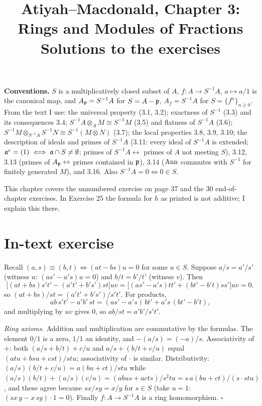 \documentclass[11pt]{article}
\title{Atiyah--Macdonald, Chapter 3: Rings and Modules of Fractions\\[2pt]\large Solutions to the exercises}
\author{}
\date{}
\begin{document}
\maketitle
\noindent\textbf{Conventions.} $S$ is a multiplicatively closed subset of $A$, $f:A\to S^{-1}A$, $a\mapsto a/1$ is the canonical map, and $A_\mathfrak p=S^{-1}A$ for $S=A-\mathfrak p$, $A_f=S^{-1}A$ for $S=\{f^n\}_{n\ge0}$. From the text I use: the universal property (3.1, 3.2); exactness of $S^{-1}$ (3.3) and its consequences 3.4; $S^{-1}A\otimes_AM\cong S^{-1}M$ (3.5) and flatness of $S^{-1}A$ (3.6); $S^{-1}M\otimes_{S^{-1}A}S^{-1}N\cong S^{-1}(M\otimes N)$ (3.7); the local properties 3.8, 3.9, 3.10; the description of ideals and primes of $S^{-1}A$ (3.11: every ideal of $S^{-1}A$ is extended; $\mathfrak a^e=(1)\iff\mathfrak a\cap S\ne\emptyset$; primes of $S^{-1}A\leftrightarrow$ primes of $A$ not meeting $S$), 3.12, 3.13 (primes of $A_\mathfrak p\leftrightarrow$ primes contained in $\mathfrak p$), 3.14 ($\operatorname{Ann}$ commutes with $S^{-1}$ for finitely generated $M$), and 3.16. Also $S^{-1}A=0\iff0\in S$.

This chapter covers the unnumbered exercise on page 37 and the 30 end-of-chapter exercises. In Exercise 25 the formula for $h$ as printed is not additive; I explain this there.

\section*{In-text exercise}

\pf
Recall $(a,s)\equiv(b,t)\iff(at-bs)u=0$ for some $u\in S$. Suppose $a/s=a'/s'$ (witness $u$: $(as'-a's)u=0$) and $b/t=b'/t'$ (witness $v$). Then
\[
\bigl[(at+bs)s't'-(a't'+b's')st\bigr]uv=\bigl[(as'-a's)tt'+(bt'-b't)ss'\bigr]uv=0,
\]
so $(at+bs)/st=(a't'+b's')/s't'$. For products,
\[
ab\,s't'-a'b'\,st=(as'-a's)\,bt'+a's\,(bt'-b't),
\]
and multiplying by $uv$ gives $0$, so $ab/st=a'b'/s't'$.

\emph{Ring axioms.} Addition and multiplication are commutative by the formulas. The element $0/1$ is a zero, $1/1$ an identity, and $-(a/s)=(-a)/s$. Associativity of $+$: both $(a/s+b/t)+c/u$ and $a/s+(b/t+c/u)$ equal $(atu+bsu+cst)/stu$; associativity of $\cdot$ is similar. Distributivity: $(a/s)(b/t+c/u)=a(bu+ct)/stu$ while $(a/s)(b/t)+(a/s)(c/u)=(abus+acts)/s^2tu=s\,a(bu+ct)/(s\cdot stu)$, and these agree because $sx/sy=x/y$ for $s\in S$ (take $u=1$: $(sx\,y-x\,sy)\cdot1=0$). Finally $f:A\to S^{-1}A$ is a ring homomorphism. \hfill$\square$
\end{document}
